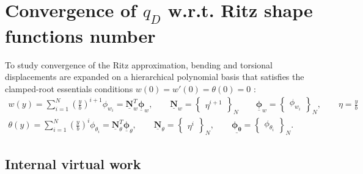 \renewcommand{\parttitle}{Convergence of $q_D$ w.r.t. Ritz shape functions number}
\section*{\parttitle}

\newcommand{\vect}[1]{\underline{\mathbf{#1}}}
\newcommand{\tenseur}[1]{\underline{\underline{\mathbf{#1}}}}

To study convergence of the Ritz approximation, bending and torsional displacements are expanded on a hierarchical polynomial basis that satisfies the clamped-root essentials conditions $w(0)=w'(0)=\theta(0)=0$ :
\begin{align}
w(y) = \sum_{i=1}^{N} \left(\frac{y}{b}\right)^{i+1}\phi_{w_i }= \vect{N}_w^{T}\vect{\phi}_w, \qquad
\vect{N}_w = \begin{Bmatrix}\eta^{i+1}\end{Bmatrix}_N \qquad \vect{\phi}_w=\begin{Bmatrix}\phi_{w_i}\end{Bmatrix}_N, \qquad \eta = \frac{y}{b} \\
\theta(y) = \sum_{i=1}^{N} \left(\frac{y}{b}\right)^{i}\phi_{\theta_i} = \vect{N}_\theta^{T}\vect{\phi}_\theta, \qquad
\vect{N}_\theta = \begin{Bmatrix}\eta^{i}\end{Bmatrix}_N, \qquad \vect{\phi_\theta}=\begin{Bmatrix}\phi_{\theta_i}\end{Bmatrix}_N .
\end{align}


\subsection*{Internal virtual work}


